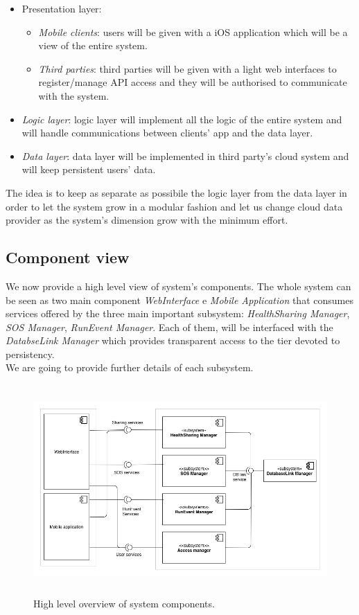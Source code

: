 \documentclass[DD.tex]{subfiles}
\begin{document}
\begin{itemize}
	\item Presentation layer:\begin{itemize}
			\item \textit{Mobile clients}: users will be given with a iOS application which will be a view of the entire system.
			\item \textit{Third parties}: third parties will be given with a light web interfaces to register/manage API access and they will be authorised to communicate with the system.
			\end{itemize}
	\item \textit{Logic layer}: logic layer will implement all the logic of the entire system and will handle communications between clients' app and the data layer.
	\item \textit{Data layer}: data layer will be implemented in third party's cloud system and will keep persistent users' data.
\end{itemize}

The idea is to keep as separate as possibile the logic layer from the data layer in order to let the system grow in a modular fashion and let us change cloud data provider as the system's dimension grow with the minimum effort.
\newpage

\subsection{Component view}
We now provide a high level view of system's components. The whole system can be seen as two main component \textit{WebInterface} e \textit{Mobile Application} that consumes services offered by the three main important subsystem: \textit{HealthSharing Manager}, \textit{SOS Manager}, \textit{RunEvent Manager}. Each of them, will be interfaced with the \textit{DatabseLink Manager} which provides transparent access to the tier devoted to persistency.
\\ We are going to provide further details of each subsystem.

\begin{figure}[h!]
	\centering
	\includegraphics[height=8.00cm,keepaspectratio]{Figures/ComponentOverview}
	\caption{High level overview of system components.}
\end{figure}
\end{document}
